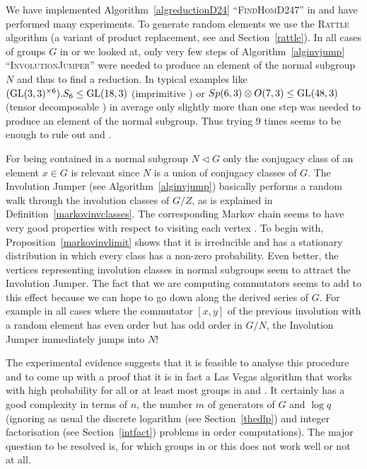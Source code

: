 \begin{Obs}
We have implemented Algorithm~\ref{algreductionD24}
``\textsc{FindHomD247}'' in {\GAP} and have
performed many experiments. To generate random elements we use the
\textsc{Rattle} algorithm (a variant of product replacement, see
%
\cite{LGMurray, LGO97} and Section~\ref{rattle}). 
In all cases of groups $G$ in  or  we
looked at, only very few steps of Algorithm~\ref{alginvjump}
``\textsc{InvolutionJumper}'' were needed to produce an element of the
normal subgroup $N$ and thus to find a reduction. In typical examples
like $(\GL(3,3)^{\times 6}).S_6 \le \GL(18,3)$ (imprimitive ) or $Sp(6,3)
\otimes O(7,3) \le \GL(48,3)$ (tensor decomposable ) 
in average only slightly more than one
step was needed to produce an element of the normal subgroup. Thus trying
$9$ times seems to be enough to rule out  and .
\end{Obs}

\begin{Expl}
For being contained in a normal subgroup $N \triangleleft G$ only the
conjugacy class of an element $x \in G$ is relevant since $N$ is a union of
conjugacy classes of $G$. The Involution Jumper (see Algorithm~\ref{alginvjump}) 
basically performs a random walk through the involution classes of $G/Z$,
as is explained in Definition~\ref{markovinvclasses}. 
The corresponding Markov chain seems to have very good properties with
respect to visiting each vertex . 
To begin with, Proposition~\ref{markovinvlimit} shows that it is irreducible
and has a stationary distribution in which every class has a non-zero 
probability. Even better, the vertices representing
involution classes in normal subgroups seem to attract the Involution
Jumper. The fact that we are computing commutators seems to add to this
effect because we can hope to go down along the derived series of $G$.
For example in all cases where the commutator $[x,y]$ of the previous
involution with a random element has even order but has odd order in
$G/N$, the Involution Jumper immediately jumps into $N$!

The experimental evidence suggests that it is feasible to analyse this
procedure and to come up with a proof that it is in fact a Las Vegas
algorithm that works with high probability for all or at least most groups
in  and . It certainly has a good complexity in terms of $n$, the
number $m$ of generators of $G$ and $\log q$ (ignoring as usual the
discrete logarithm (see Section~\ref{thedlp}) and integer factorisation 
(see Section~\ref{intfact}) problems in order computations). 
The major question to be
resolved is, for which groups in  or  this
does not work well or not at all.
\end{Expl}

